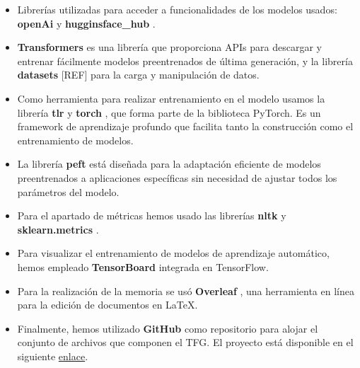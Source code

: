 \begin{itemize}
    \item Librerías utilizadas para acceder a funcionalidades de los modelos usados: \textbf{openAi} \cite{APIOpenApi} y \textbf{hugginsface\_hub} \cite{HuggingFace}.
    \item \textbf{Transformers} \cite{Transformers} es una librería que proporciona APIs para descargar y entrenar fácilmente modelos preentrenados de última generación, y la librería \textbf{datasets} [REF] para la carga y manipulación de datos.
    \item Como herramienta para realizar entrenamiento en el modelo usamos la librería \textbf{tlr} \cite{Tlr} y \textbf{torch} \cite{Torch}, que forma parte de la biblioteca PyTorch. Es un framework de aprendizaje profundo que facilita tanto la construcción como el entrenamiento de modelos.
    \item La librería \textbf{peft} \cite{Peft} está diseñada para la adaptación eficiente de modelos preentrenados a aplicaciones específicas sin necesidad de ajustar todos los parámetros del modelo.
    \item Para el apartado de métricas hemos usado las librerías \textbf{nltk} \cite{Nltk}y \textbf{sklearn.metrics} \cite{SklearnMetrics}.
    \item Para visualizar el entrenamiento de modelos de aprendizaje automático, hemos empleado \textbf{TensorBoard} \cite{TensorBoard} integrada en TensorFlow.
    \item Para la realización de la memoria se usó \textbf{Overleaf} \cite{Overleaf}, una herramienta en línea para la edición de documentos en LaTeX.
    \item Finalmente, hemos utilizado \textbf{GitHub} como repositorio para alojar el conjunto de archivos que componen el TFG. El proyecto está disponible en el siguiente \href{https://github.com/abel-gonzalez/TFG.git}{enlace}.




\end{itemize}
